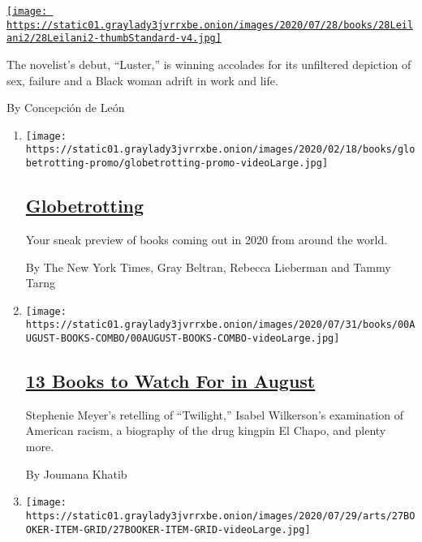 \begin{enumerate}
\begin{enumerate}
    \href{/2020/07/31/books/raven-leilani-luster.html}{\texttt{[image: https://static01.graylady3jvrrxbe.onion/images/2020/07/28/books/28Leilani2/28Leilani2-thumbStandard-v4.jpg]}}

    The novelist's debut, ``Luster,'' is winning accolades for its
    unfiltered depiction of sex, failure and a Black woman adrift in
    work and life.

    By Concepción de León
  \end{enumerate}
\end{enumerate}

\begin{enumerate}
\def\labelenumi{\arabic{enumi}.}
\item
  \texttt{[image: https://static01.graylady3jvrrxbe.onion/images/2020/02/18/books/globetrotting-promo/globetrotting-promo-videoLarge.jpg]}

  \hypertarget{globetrotting}{%
  \subsection{\texorpdfstring{\href{/interactive/2020/01/08/books/new-books-international.html}{Globetrotting}}{Globetrotting}}\label{globetrotting}}

  Your sneak preview of books coming out in 2020 from around the world.

  By The New York Times, Gray Beltran, Rebecca Lieberman and Tammy Tarng
\item
  \texttt{[image: https://static01.graylady3jvrrxbe.onion/images/2020/07/31/books/00AUGUST-BOOKS-COMBO/00AUGUST-BOOKS-COMBO-videoLarge.jpg]}

  \hypertarget{13-books-to-watch-for-in-august}{%
  \subsection{\texorpdfstring{\href{/2020/07/30/books/new-august-books.html}{13
  Books to Watch For in
  August}}{13 Books to Watch For in August}}\label{13-books-to-watch-for-in-august}}

  Stephenie Meyer's retelling of ``Twilight,'' Isabel Wilkerson's
  examination of American racism, a biography of the drug kingpin El
  Chapo, and plenty more.

  By Joumana Khatib
\item
  \texttt{[image: https://static01.graylady3jvrrxbe.onion/images/2020/07/29/arts/27BOOKER-ITEM-GRID/27BOOKER-ITEM-GRID-videoLarge.jpg]}

  \hypertarget{hilary-mantel-kiley-reid-anne-tyler-in-running-for-booker-prize}{%
}
\end{enumerate}
